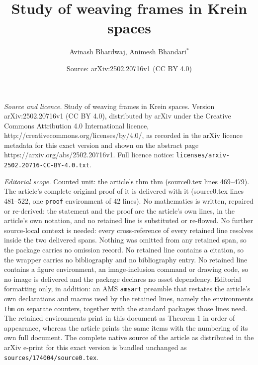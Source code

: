 \documentclass[10pt,a4paper]{amsart}
\title{Study of weaving frames in Krein spaces}
\author{Avinash Bhardwaj, Animesh Bhandari$^*$}
\date{Source: arXiv:2502.20716v1 (CC BY 4.0)}
\begin{document}
\maketitle

\noindent\emph{Source and licence.} Study of weaving frames in Krein spaces. Version arXiv:2502.20716v1 (CC BY 4.0), distributed by arXiv under the Creative Commons Attribution 4.0 International licence, http://creativecommons.org/licenses/by/4.0/, as recorded in the arXiv licence metadata for this exact version and shown on the abstract page https://arxiv.org/abs/2502.20716v1. Full licence notice: \texttt{licenses/arxiv-2502.20716-CC-BY-4.0.txt}.\par\smallskip

\noindent\textit{Editorial scope.} Counted unit: the article's thm thm (source0.tex lines 469--479). The article's complete original proof of it is delivered with it (source0.tex lines 481--522, one \texttt{proof} environment of 42 lines). No mathematics is written, repaired or re-derived: the statement and the proof are the article's own lines, in the article's own notation, and no retained line is substituted or re-flowed.  No further source-local context is needed: every cross-reference of every retained line resolves inside the two delivered spans.  Nothing was omitted from any retained span, so the package carries no omission record.  No retained line contains a citation, so the wrapper carries no bibliography and no bibliography entry.  No retained line contains a figure environment, an image-inclusion command or drawing code, so no image is delivered and the package declares no asset dependency.  Editorial formatting only, in addition: an AMS \texttt{amsart} preamble that restates the article's own declarations and macros used by the retained lines, namely the environments \texttt{thm} on separate counters, together with the standard packages those lines need.  The retained environments print in this document as Theorem 1 in order of appearance, whereas the article prints the same items with the numbering of its own full document.  The complete native source of the article as distributed in the arXiv e-print for this exact version is bundled unchanged as \texttt{sources/174004/source0.tex}.
\end{document}
